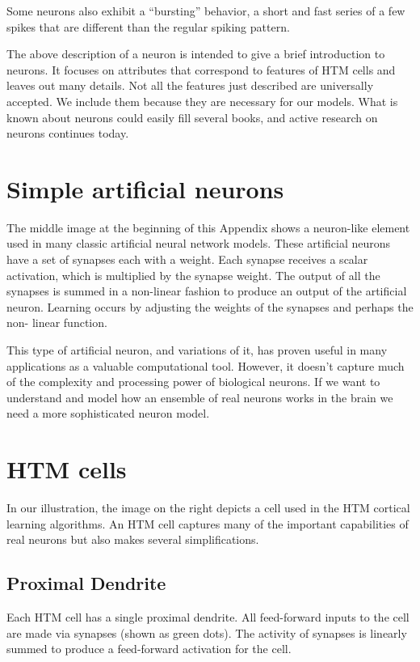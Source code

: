 Some neurons also exhibit a ``bursting'' behavior, a short and fast
series of a few spikes that are different than the regular spiking
pattern.

The above description of a neuron is intended to give a brief
introduction to neurons. It focuses on attributes that correspond to
features of HTM cells and leaves out many details. Not all the
features just described are universally accepted. We include them
because they are necessary for our models. What is known about neurons
could easily fill several books, and active research on neurons
continues today.

\section*{Simple artificial neurons}
The middle image at the beginning of this Appendix shows a neuron-like
element used in many classic artificial neural network models. These
artificial neurons have a set of synapses each with a weight. Each
synapse receives a scalar activation, which is multiplied by the
synapse weight. The output of all the synapses is summed in a
non-linear fashion to produce an output of the artificial
neuron. Learning occurs by adjusting the weights of the synapses and
perhaps the non- linear function.

This type of artificial neuron, and variations of it, has proven
useful in many applications as a valuable computational tool. However,
it doesn't capture much of the complexity and processing power of
biological neurons. If we want to understand and model how an ensemble
of real neurons works in the brain we need a more sophisticated neuron
model.

\section*{HTM cells}
In our illustration, the image on the right depicts a cell used in the
HTM cortical learning algorithms. An HTM cell captures many of the
important capabilities of real neurons but also makes several
simplifications.

\subsection*{Proximal Dendrite}
Each HTM cell has a single proximal dendrite. All feed-forward inputs
to the cell are made via synapses (shown as green dots). The activity
of synapses is linearly summed to produce a feed-forward activation
for the cell.


